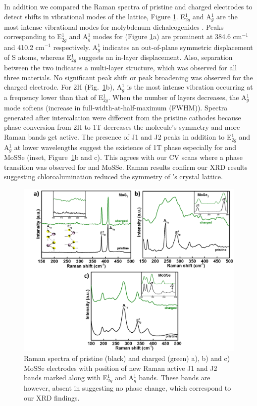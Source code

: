 In addition we compared the Raman spectra of pristine and charged electrodes to detect shifts in vibrational modes of the lattice, Figure \ref{Figures/chap4fig:raman}. E$^1_{2g}$ and A$^1_g$ are the most intense vibrational modes for molybdenum dichalcogenides \cite{yang_pressure-induced_2019, r_2d_2017,sharma_stable_2018}. Peaks corresponding to E$^1_{2g}$ and A$^1_g$ modes for  (Figure \ref{Figures/chap4fig:raman}a) are prominent at 384.6 cm$^{-1}$ and 410.2 cm$^{-1}$ respectively. A$^1_g$ indicates an out-of-plane symmetric displacement of S atoms, whereas E$^1_{2g}$ suggests an in-layer displacement. Also, separation between the two indicates a multi-layer structure, which was observed for all three materials. No significant peak shift or peak broadening was observed for the charged  electrode. For 2H (Fig.\ \ref{Figures/chap4fig:raman}b), A$^1_g$ is the most intense vibration occurring at a frequency lower than that of E$^1_{2g}$. When the number of layers decreases, the A$^1_g$ mode softens (increase in full-width-at-half-maximum (FWHM)). Spectra generated after intercalation were different from the pristine cathodes because phase conversion from 2H to 1T decreases the molecule's symmetry and more Raman bands get active. The presence of J1 and J2 peaks in addition to E$^1_{2g}$ and A$^1_g$ at lower wavelengths suggest the existence of 1T phase especially for  and MoSSe (inset, Figure\ \ref{Figures/chap4fig:raman}b and c). This agrees with our CV scans where a phase transition was observed for  and MoSSe. Raman results confirm our XRD results suggesting chloroalumination reduced the symmetry of 's crystal lattice. 
\begin{figure}[htb!]
\centering
\includegraphics[width=\textwidth]{Figures/chap4fig/raman}
\caption{Raman spectra of pristine (black) and charged (green) a), b)  and c) MoSSe electrodes with position of new Raman active J1 and J2 bands marked along with E$^1_{2g}$ and A$^1_g$ bands. These bands are however, absent in  suggesting no phase change, which correspond to our XRD findings.}
\label{Figures/chap4fig:raman}
\end{figure}

